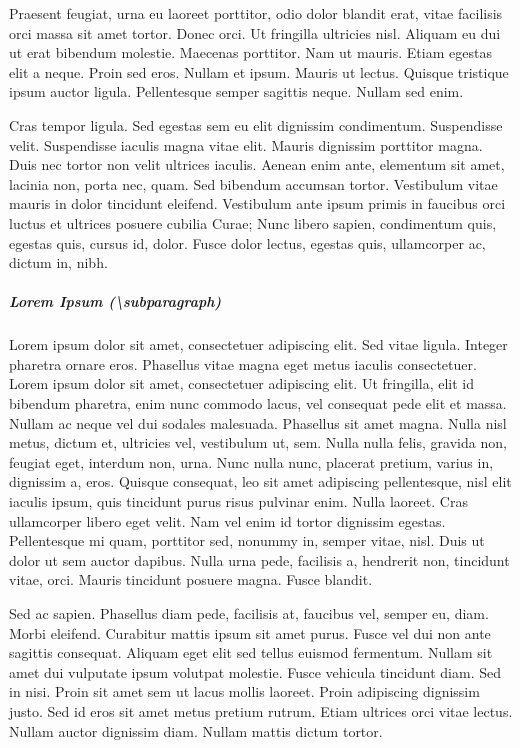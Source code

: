 \documentclass[article,colorback,accentcolor=tud4c]{tudreport}
\begin{document}
    Praesent feugiat, urna eu laoreet porttitor, odio dolor blandit erat, vitae facilisis orci massa sit amet tortor. Donec orci. Ut fringilla ultricies nisl. Aliquam eu dui ut erat bibendum molestie. Maecenas porttitor. Nam ut mauris. Etiam egestas elit a neque. Proin sed eros. Nullam et ipsum. Mauris ut lectus. Quisque tristique ipsum auctor ligula. Pellentesque semper sagittis neque. Nullam sed enim.

    Cras tempor ligula. Sed egestas sem eu elit dignissim condimentum. Suspendisse velit. Suspendisse iaculis magna vitae elit. Mauris dignissim porttitor magna. Duis nec tortor non velit ultrices iaculis. Aenean enim ante, elementum sit amet, lacinia non, porta nec, quam. Sed bibendum accumsan tortor. Vestibulum vitae mauris in dolor tincidunt eleifend. Vestibulum ante ipsum primis in faucibus orci luctus et ultrices posuere cubilia Curae; Nunc libero sapien, condimentum quis, egestas quis, cursus id, dolor. Fusce dolor lectus, egestas quis, ullamcorper ac, dictum in, nibh.

  \subparagraph{Lorem Ipsum (\textbackslash subparagraph)}

    Lorem ipsum dolor sit amet, consectetuer adipiscing elit. Sed vitae ligula. Integer pharetra ornare eros. Phasellus vitae magna eget metus iaculis consectetuer. Lorem ipsum dolor sit amet, consectetuer adipiscing elit. Ut fringilla, elit id bibendum pharetra, enim nunc commodo lacus, vel consequat pede elit et massa. Nullam ac neque vel dui sodales malesuada. Phasellus sit amet magna. Nulla nisl metus, dictum et, ultricies vel, vestibulum ut, sem. Nulla nulla felis, gravida non, feugiat eget, interdum non, urna. Nunc nulla nunc, placerat pretium, varius in, dignissim a, eros. Quisque consequat, leo sit amet adipiscing pellentesque, nisl elit iaculis ipsum, quis tincidunt purus risus pulvinar enim. Nulla laoreet. Cras ullamcorper libero eget velit. Nam vel enim id tortor dignissim egestas. Pellentesque mi quam, porttitor sed, nonummy in, semper vitae, nisl. Duis ut dolor ut sem auctor dapibus. Nulla urna pede, facilisis a, hendrerit non, tincidunt vitae, orci. Mauris tincidunt posuere magna. Fusce blandit.

    Sed ac sapien. Phasellus diam pede, facilisis at, faucibus vel, semper eu, diam. Morbi eleifend. Curabitur mattis ipsum sit amet purus. Fusce vel dui non ante sagittis consequat. Aliquam eget elit sed tellus euismod fermentum. Nullam sit amet dui vulputate ipsum volutpat molestie. Fusce vehicula tincidunt diam. Sed in nisi. Proin sit amet sem ut lacus mollis laoreet. Proin adipiscing dignissim justo. Sed id eros sit amet metus pretium rutrum. Etiam ultrices orci vitae lectus. Nullam auctor dignissim diam. Nullam mattis dictum tortor.
\end{document}
